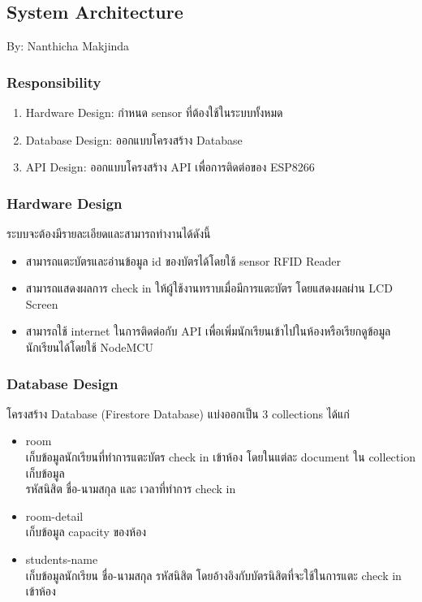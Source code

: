 \documentclass[fontsize=14pt]{extarticle}
\begin{document}
\subsection{System Architecture}
By: Nanthicha Makjinda \\
\subsubsection{Responsibility}
\begin{enumerate}
    \item Hardware Design: กำหนด sensor ที่ต้องใช้ในระบบทั้งหมด
    \item Database Design: ออกแบบโครงสร้าง Database
    \item API Design: ออกแบบโครงสร้าง API เพื่อการติดต่อของ ESP8266
\end{enumerate}
\subsubsection{Hardware Design}
ระบบจะต้องมีรายละเอียดและสามารถทำงานได้ดังนี้
\begin{itemize}
    \item สามารถแตะบัตรและอ่านข้อมูล id ของบัตรได้โดยใช้ sensor RFID Reader
    \item สามารถแสดงผลการ check in ให้ผู้ใช้งานทราบเมื่อมีการแตะบัตร โดยแสดงผลผ่าน LCD Screen
    \item สามารถใช้ internet ในการติดต่อกับ API เพื่อเพิ่มนักเรียนเข้าไปในห้องหรือเรียกดูข้อมูลนักเรียนได้โดยใช้ NodeMCU
\end{itemize}
\subsubsection{Database Design}
โครงสร้าง Database (Firestore Database) แบ่งออกเป็น 3 collections ได้แก่
\begin{itemize}
    \item room \\
          เก็บข้อมูลนักเรียนที่ทำการแตะบัตร check in เข้าห้อง โดยในแต่ละ document ใน collection เก็บข้อมูล \\
          รหัสนิสิต ชื่อ-นามสกุล และ เวลาที่ทำการ check in
    \item room-detail \\
          เก็บข้อมูล capacity ของห้อง
    \item students-name \\
          เก็บข้อมูลนักเรียน ชื่อ-นามสกุล รหัสนิสิต โดยอ้างอิงกับบัตรนิสิตที่จะใช้ในการแตะ check in เข้าห้อง
\end{itemize}
\end{document}
